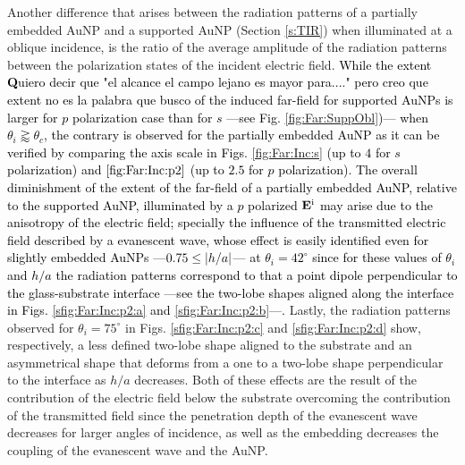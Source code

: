 Another difference that arises between  the radiation patterns of a partially embedded AuNP and a supported AuNP (Section \ref{s:TIR}) when illuminated at a oblique incidence, is the ratio of the  average amplitude of the radiation patterns between the  polarization states of the incident electric field. \textcolor{black}{While the extent \textcolor{black}{\textbf Quiero decir que "el alcance el campo lejano es mayor para...." pero creo que extent no es la palabra que busco} of the induced far-field for supported AuNPs is larger for  $p$ polarization case than for $s$ ---see Fig. \ref{fig:Far:SuppObl})--- when $\theta_i \gtrapprox  \theta_c$, the contrary is observed for the partially embedded AuNP as it can be verified by comparing the axis scale in Figs. \ref{fig:Far:Inc:s} (up to $4$ for $s$ polarization) and $\ref{fig:Far:Inc:p2}$ (up to $2.5$ for $p$ polarization). The overall diminishment of the extent of the far-field of a partially embedded AuNP, relative to the supported AuNP, illuminated by a $p$ polarized $\vb{E}^\text{i}$ may arise due to the anisotropy of the electric field; specially the influence of the transmitted electric field described by a evanescent wave, whose effect is easily identified even for slightly embedded AuNPs ---$0.75\leq\abs{h/a}$--- at $\theta_i=42^\circ$ since for these values of $\theta_i$ and $h/a$ the radiation patterns correspond to that a point dipole perpendicular to the glass-substrate interface ---see the two-lobe shapes aligned along the interface in Figs. \ref{sfig:Far:Inc:p2:a} and \ref{sfig:Far:Inc:p2:b}---.} Lastly, the radiation patterns observed for $\theta_i = 75^\circ$ in Figs. \ref{sfig:Far:Inc:p2:c} and \ref{sfig:Far:Inc:p2:d} show, respectively, a less defined two-lobe shape aligned to the substrate and an asymmetrical shape that deforms from  a one to a two-lobe shape perpendicular to the interface as $h/a$ decreases. Both of these effects  are the result of the contribution of the electric field below the substrate overcoming the contribution of the transmitted field since the penetration depth of the evanescent wave decreases for larger angles of incidence, as well as the embedding  decreases the coupling of the evanescent wave and the AuNP.

